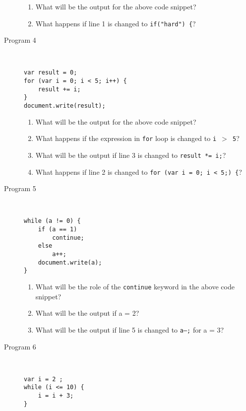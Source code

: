 \documentclass[11pt,a4paper]{article}
\def\AnswerBox{\fbox{\begin{minipage}{4in}\hfill\vspace{0.5in}\end{minipage}}}
\begin{document}
\begin{description}
\begin{enumerate}[label=\bfseries Q\arabic*:]\itemsep10pt
\item What will be the output for the above code snippet?
\item What happens if line 1 is changed to \texttt{if("hard") \{}?
\end{enumerate}

\item [Program 4]\
\begin{lstlisting}
var result = 0;
for (var i = 0; i < 5; i++) {
    result += i;
}
document.write(result);
\end{lstlisting}

\AnswerBox

\begin{enumerate}[label=\bfseries Q\arabic*:]\itemsep10pt
\item What will be the output for the above code snippet?
\item What happens if the expression in \texttt{for} loop is changed to \texttt{i $>$ 5}?
\item What will be the output if line 3 is changed to \texttt{result *= i;}?
\item What happens if line 2 is changed to \texttt{for (var i = 0; i < 5;) \{}?
\end{enumerate}

\item [Program 5]\

\begin{lstlisting}
while (a != 0) {
    if (a == 1) 
        continue;
    else 
        a++;
    document.write(a);
}
\end{lstlisting}

\AnswerBox

\begin{enumerate}[label=\bfseries Q\arabic*:]\itemsep10pt
\item What will be the role of the \texttt{continue} keyword in the above code snippet?
\item What will be the output if a = 2?
\item What will be the output if line 5 is changed to \texttt{a--;} for a = 3?
\end{enumerate}

\item [Program 6]\
\begin{lstlisting}
var i = 2 ;
while (i <= 10) {
    i = i + 3;
}
\end{lstlisting}


\end{description}
\end{document}
